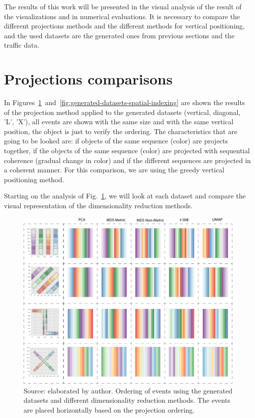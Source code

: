 \label{ch:results}

The results of this work will be presented in the visual analysis of the result of the visualizations and in numerical evaluations.
%
It is necessary to compare the different projections methods and the different methods for vertical positioning,
%
and the used datasets are the generated ones from previous sections and the traffic data.

\section{Projections comparisons}

In Figures~\ref{fig:generated-datasets-dimensionality-reduction}~and~\ref{fig:generated-datasets-spatial-indexing} are shown the results of the projection method applied to the generated datasets (vertical, diagonal, 'L', 'X'), all events are shown with the same size and with the same vertical position, the object is just to verify the ordering.
%
The characteristics that are going to be looked are: if objects of the same sequence (color) are projects together, if the objects of the same sequence (color) are projected with sequential coherence (gradual change in color) and if the different sequences are projected in a coherent manner.
For this comparison, we are using the greedy vertical positioning method.

Starting on the analysis of Fig.~\ref{fig:generated-datasets-dimensionality-reduction}, we will look at each dataset and compare the visual representation of the dimensionality reduction methods.
%

\begin{figure}
    \centering
    \includegraphics[width = \textwidth]{src/imgs/generated-datasets-dimensionality-reduction.pdf}
    \caption{Source: elaborated by author. Ordering of events using the generated datasets and different dimensionality reduction methods. The events are placed horizontally based on the projection ordering.}
    \label{fig:generated-datasets-dimensionality-reduction}
\end{figure}


